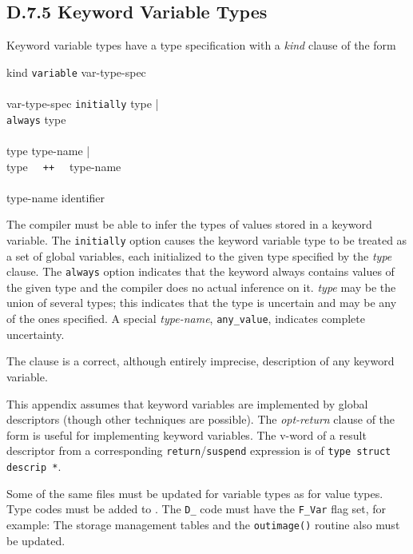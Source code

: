 \subsection{D.7.5 Keyword Variable Types}

Keyword variable types have a type specification with a \textit{kind}
clause of the form
\begin{ebnf}
kind \cceq \texttt{variable} var-type-spec\\
\\
var-type-spec \cceq \texttt{initially} type |\\
\>\>\>\>\>\>        \texttt{always} type\\
\\
type \cceq type-name |\\
\>\>\>     type \texttt{~~++~~} type-name\\
\\
type-name \cceq identifier
\end{ebnf}

The compiler must be able to infer the types of values stored in a
keyword variable. The \texttt{initially} option causes the keyword
variable type to be treated as a set of global variables, each
initialized to the given type specified by the \textit{type}
clause. The \texttt{always} option indicates that the keyword always
contains values of the given type and the compiler does no actual
inference on it. \textit{type} may be the union of several types; this
indicates that the type is uncertain and may be any of the ones
specified. A special \textit{type-name}, \texttt{any\_value},
indicates complete uncertainty.

\noindent The clause
\noindent
is a correct, although entirely imprecise, description of any keyword variable.

This appendix assumes that keyword variables are implemented by global
descriptors (though other techniques are possible). The \textit{opt-return}
clause of the form
\noindent
is useful for implementing keyword variables. The v-word of a result
descriptor from a corresponding \texttt{return}/\texttt{suspend}
expression is of \texttt{type struct descrip *}.


Some of the same files must be updated for variable types as for value
types. Type codes must be added to .
The \texttt{D\_} code must have the \texttt{F\_Var} flag set, for example:
\noindent
The storage management tables and the \texttt{outimage()} routine also must be
updated.


